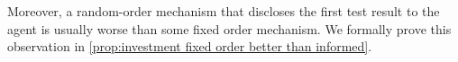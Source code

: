 Moreover, a random-order mechanism that discloses the first test result to the agent is usually worse than some fixed order mechanism.
We formally prove this observation in \cref{prop:investment fixed order better than informed}.










